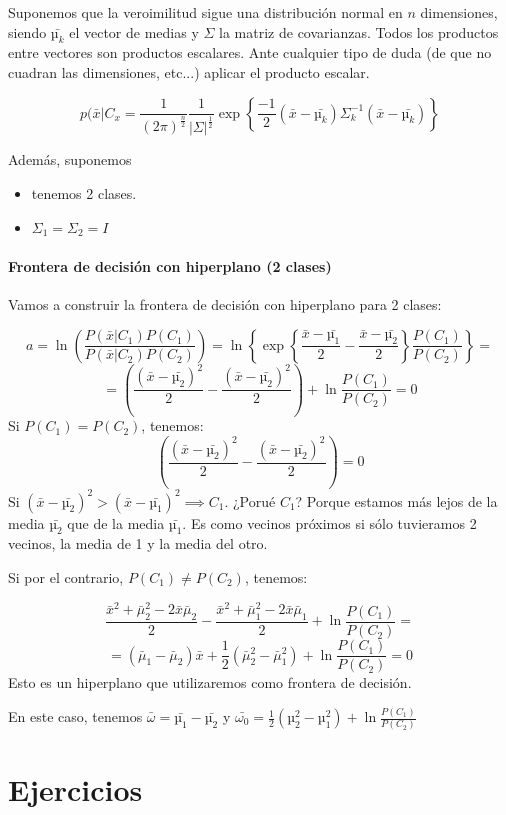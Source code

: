 \documentclass{apuntes}
\begin{document}
Suponemos que la veroimilitud sigue una distribución normal en $n$ dimensiones, siendo $\bar{µ_k}$ el vector de medias y $\Sigma$ la matriz de covarianzas. Todos los productos entre vectores son productos escalares. Ante cualquier tipo de duda (de que no cuadran las dimensiones, etc...) aplicar el producto escalar.

\[
p(\bar{x}|C_{x} = \frac{1}{(2π)^{\frac{n}{2}}}\frac{1}{|\Sigma|^{\frac{1}{2}}} \exp \left\{  \frac{-1}{2} (\bar{x} - \bar{µ_k}) \Sigma_k^{-1} (\bar{x} - \bar{µ_k}) \right\} 
\]

Además, suponemos 
\begin{itemize}
	\item  tenemos 2 clases.
	\item $\Sigma_1 = \Sigma_2 = I$
\end{itemize}

\subsubsection{Frontera de decisión con hiperplano (2 clases)}

Vamos a construir la frontera de decisión con hiperplano para 2 clases:

\[
a = \ln\left( \frac{P(\bar{x}|C_1)P(C_1)}{P(\bar{x}|C_2)P(C_2)}\right) = \ln \left\{ \exp \left\{ \frac{\bar{x}-\bar{µ_1}}{2} - \frac{\bar{x} - \bar{µ_2}}{2} \right\} \frac{P(C_1)}{P(C_2)}\right\} = 
\]
\[
= \left( \frac{(\bar{x} - \bar{µ_2})^2}{2} - \frac{(\bar{x} - \bar{µ_2})^2}{2}\right) + \ln \frac{P(C_1)}{P(C_2)} = 0
\]
Si $P(C_1) = P(C_2)$, tenemos:
\[
\left( \frac{(\bar{x} - \bar{µ_2})^2}{2} - \frac{(\bar{x} - \bar{µ_2})^2}{2}\right) = 0
\]
Si $(\bar{x} - \bar{µ_2})^2 > (\bar{x} - \bar{µ_1})^2 \implies C_1$. ¿Porué $C_1$? Porque estamos más lejos de la media $\bar{µ_2}$ que de la media $\bar{µ_1}$. Es como vecinos próximos si sólo tuvieramos 2 vecinos, la media de 1 y la media del otro.

Si por el contrario, $P(C_1) ≠ P(C_2)$, tenemos: 

\[
\frac{\bar{x}^2 + \bar{\mu}_2^2 - 2\bar{x}\bar{\mu}_2}{2} - \frac{\bar{x}^2 + \bar{\mu}_1^2 - 2\bar{x}\bar{\mu}_1}{2} + \ln\frac{P(C_1)}{P(C_2)} = 
\]
\begin{equation}
= (\bar{\mu}_1 - \bar{\mu}_2) \bar{x} + \frac{1}{2} (\bar{\mu}_2^2 - \bar{\mu}_1^2) + \ln\frac{P(C_1)}{P(C_2)} = 0
\end{equation}
Esto es un hiperplano que utilizaremos como frontera de decisión. 

\begin{framed}
En este caso, tenemos $\bar{ω} = \bar{µ_1} - \bar{µ_2}$ y $\bar{ω_0} = \frac{1}{2}(µ_2^2 - µ_1^2) + \ln \frac{P(C_1)}{P(C_2)}$
\end{framed}

\appendix


\chapter{Ejercicios}

\printindex
\end{document}
